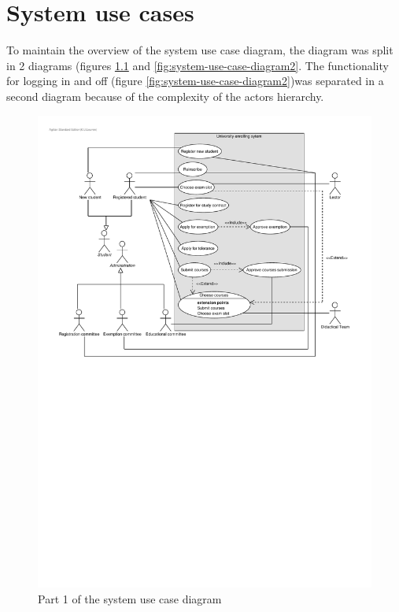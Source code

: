 \chapter{System use cases}
\label{system-uc}

\par To maintain the overview of the system use case diagram, the diagram was
split in 2 diagrams (figures \ref{fig:system-use-case-diagram1} and
\ref{fig:system-use-case-diagram2}. The functionality for logging in and off
(figure \ref{fig:system-use-case-diagram2})was separated in a second diagram
because of the complexity of the actors hierarchy.

\begin{figure}[H]
	\begin{centering}
		\includegraphics[width=\textwidth]{figs/system-use-case-diagram1.pdf}
		\caption{Part 1 of the system use case diagram}
		\label{fig:system-use-case-diagram1}
	\end{centering}
\end{figure}

